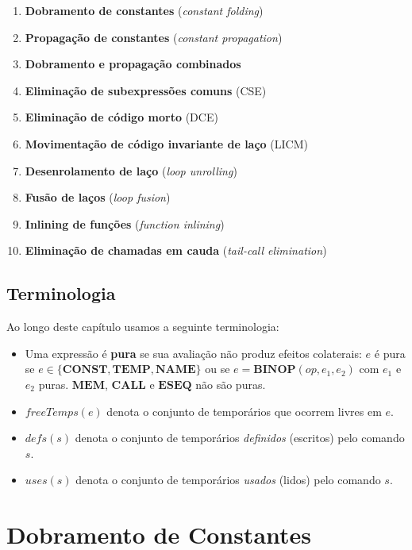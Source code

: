\begin{enumerate}
  \item \textbf{Dobramento de constantes} (\emph{constant folding})
  \item \textbf{Propagação de constantes} (\emph{constant propagation})
  \item \textbf{Dobramento e propagação combinados}
  \item \textbf{Eliminação de subexpressões comuns} (CSE)
  \item \textbf{Eliminação de código morto} (DCE)
  \item \textbf{Movimentação de código invariante de laço} (LICM)
  \item \textbf{Desenrolamento de laço} (\emph{loop unrolling})
  \item \textbf{Fusão de laços} (\emph{loop fusion})
  \item \textbf{Inlining de funções} (\emph{function inlining})
  \item \textbf{Eliminação de chamadas em cauda} (\emph{tail-call elimination})
\end{enumerate}

\subsection*{Terminologia}

Ao longo deste capítulo usamos a seguinte terminologia:

\begin{itemize}
  \item Uma expressão é \textbf{pura} se sua avaliação não produz efeitos
    colaterais: $e$ é pura se $e \in \{\mathbf{CONST}, \mathbf{TEMP},
    \mathbf{NAME}\}$ ou se $e = \mathbf{BINOP}(\mathit{op}, e_1, e_2)$ com
    $e_1$ e $e_2$ puras.  $\mathbf{MEM}$, $\mathbf{CALL}$ e $\mathbf{ESEQ}$
    não são puras.
  \item $\mathit{freeTemps}(e)$ denota o conjunto de temporários que ocorrem
    livres em $e$.
  \item $\mathit{defs}(s)$ denota o conjunto de temporários \emph{definidos}
    (escritos) pelo comando $s$.
  \item $\mathit{uses}(s)$ denota o conjunto de temporários \emph{usados}
    (lidos) pelo comando $s$.
\end{itemize}

\section{Dobramento de Constantes}\label{sec:opt-fold}

